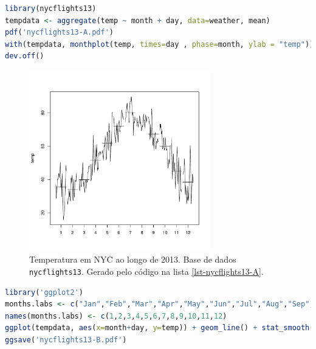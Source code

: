 \begin{frame}
\frametitle{}
\begin{lstlisting}[language=R, label=lst-nycflights13-A, caption={Box plot.}, postbreak=\mbox{$\hookrightarrow$\space}, basicstyle=\fontsize{8}{10}\selectfont\ttfamily]
library(nycflights13)
tempdata <- aggregate(temp ~ month + day, data=weather, mean)
pdf('nycflights13-A.pdf')
with(tempdata, monthplot(temp, times=day , phase=month, ylab = "temp"))
dev.off()
\end{lstlisting}

\begin{figure}[h]
 \centering
  \includegraphics[width=0.7\textwidth,height=0.7\textheight,keepaspectratio]{figures/nycflights13-A.pdf}
 \caption{Temperatura em NYC ao longo de 2013. Base de dados \texttt{nycflights13}. Gerado pelo código na lista \ref{lst-nycflights13-A}.}
 \label{fig-nycflights13-A}
\end{figure}

\framebreak

\begin{lstlisting}[language=R, label=lst-nycflights13-B, caption={Box plot.}, postbreak=\mbox{$\hookrightarrow$\space}, basicstyle=\fontsize{8}{10}\selectfont\ttfamily]
library('ggplot2')
months.labs <- c("Jan","Feb","Mar","Apr","May","Jun","Jul","Aug","Sep","Oct","Nov","Dez")
names(months.labs) <- c(1,2,3,4,5,6,7,8,9,10,11,12)
ggplot(tempdata, aes(x=month+day, y=temp)) + geom_line() + stat_smooth(method="lm", formula=y~1, se=F) + facet_wrap(~month, nrow=1, labeller = labeller(month=months.labs)) + theme_minimal() + theme(axis.text.x = element_blank(), axis.title.x = element_blank(), panel.grid.major = element_blank(), panel.grid.minor = element_blank()) + labs(title="Temperature in NYC in 2013", y="Temperature (°F)")
ggsave('nycflights13-B.pdf')
\end{lstlisting}


\end{frame}
